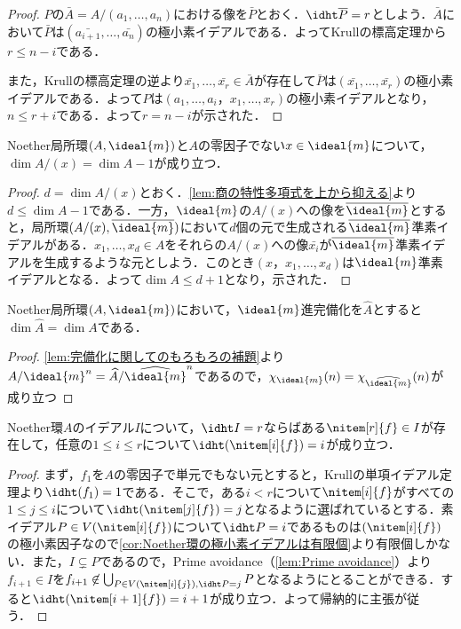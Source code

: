\begin{proof}
	$P$の$\bar{A}=A/(a_1,\dots,a_n)$における像を$\bar{P}$とおく．$\idht \bar{P}=r$としよう．$\bar{A}$において$\bar{P}$は$(\bar{a_{i+1}},\dots,\bar{a_n})$の極小素イデアルである．よってKrullの標高定理から$r\leq n-i$である．
	
	また，Krullの標高定理の逆より$\bar{x_1},\dots,\bar{x_r}\in\bar{A}$が存在して$\bar{P}$は$(\bar{x_1},\dots,\bar{x_r})$の極小素イデアルである．よって$P$は$(a_1,\dots,a_i，x_1,\dots,x_r)$の極小素イデアルとなり，$n\leq r+i$である．よって$r=n-i$が示された．
\end{proof}

\begin{prop}\label{prop:dim A/xA=dim A-1}
	Noether局所環$(A,\ideal{m})$と$A$の零因子でない$x\in\ideal{m}$について，$\dim A/(x)=\dim A-1$が成り立つ．
\end{prop}

\begin{proof}
	$d=\dim A/(x)$とおく．\ref{lem:商の特性多項式を上から抑える}より$d\leq \dim A-1$である．一方，$\ideal{m}$の$A/(x)$への像を$\bar{\ideal{m}}$とすると，局所環$(A/(x),\bar{\ideal{m}})$において$d$個の元で生成される$\bar{\ideal{m}}$準素イデアルがある．$x_1,\dots,x_d\in A$をそれらの$A/(x)$への像$\bar{x_i}$が$\bar{\ideal{m}}$準素イデアルを生成するような元としよう．このとき$(x，x_1,\dots,x_d)$は$\ideal{m}$準素イデアルとなる．よって$\dim A\leq d+1$となり，示された．
\end{proof}

\begin{thm}
	Noether局所環$(A,\ideal{m})$において，$\ideal{m}$進完備化を$\widehat{A}$とすると$\dim\widehat{A}=\dim A$である．
\end{thm}

\begin{proof}
	\ref{lem:完備化に関してのもろもろの補題}より$A/\ideal{m}^n=\widehat{A}/{\widehat{\ideal{m}}}^n$であるので，$\chi_{\ideal{m}}(n)=\chi_{\widehat{\ideal{m}}}(n)$が成り立つ
\end{proof}

\begin{prop}\label{prop:イデアルの高さと生成系の個数}
	Noether環$A$のイデアル$I$について，$\idht I=r$ならばある$\nitem[r]{f}\in I$が存在して，任意の$1\leq i\leq r$について$\idht (\nitem[i]{f})=i$が成り立つ．
\end{prop}

\begin{proof}
	まず，$f_1$を$A$の零因子で単元でもない元とすると，Krullの単項イデアル定理より$\idht (f_1)=1$である．そこで，ある$i<r$について$\nitem[i]{f}$がすべての$1\leq j\leq i$について$\idht (\nitem[j]{f})=j$となるように選ばれているとする．素イデアル$P\in V(\nitem[i]{f})$について$\idht P=i$であるものは$(\nitem[i]{f})$の極小素因子なので\ref{cor:Noether環の極小素イデアルは有限個}より有限個しかない．また，$I\subsetneq P$であるので，Prime avoidance（\ref{lem:Prime avoidance}）より$f_{i+1}\in I$を$f_{i+1}\not\in\bigcup_{P\in V(\nitem[i]{j}),\idht P=j} P$となるようにとることができる．すると$\idht (\nitem[i+1]{f})=i+1$が成り立つ．よって帰納的に主張が従う．
\end{proof}

